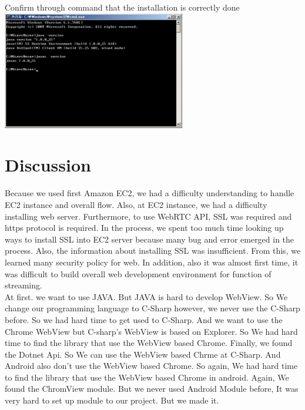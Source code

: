 \documentclass[12pt]{article}
\begin{document}
\begin{center}
Confirm through command that the installation is correctly done\\ [1\baselineskip]
\includegraphics[width=80mm,scale=1.3]{jdk8}
\end{center}

\newpage

\section{Discussion}
Because we used first Amazon EC2, we had a difficulty understanding to handle EC2 instance and overall flow. Also, at EC2 instance, we had a difficulty installing web server. Furthermore, to use WebRTC API, SSL was required and https protocol is required. In the process, we spent too much time looking up ways to install SSL into EC2 server because many bug and error emerged in the process. Also, the information about installing SSL was insufficient. From this, we learned many security policy for web. In addition, also it was almost first time, it was difficult to build overall web development environment for function of streaming.\\

At first. we want to use JAVA. But JAVA is hard to develop WebView. So We change our programming language to C-Sharp however, we never use the C-Sharp before. So we had hard time to get used to C-Sharp. And we want to use the Chrome WebView but C-sharp’s WebView is based on Explorer. So We had hard time to find the library that use the WebView based Chrome. Finally, we found the Dotnet Api. So We can use the WebView based Chrme at C-Sharp. And Android also don’t use the WebView based Chrome. So again, We had hard time to find the library that use the WebView based Chrome in android. Again, We found the ChromView module. But we never used Android Module before, It was very hard to set up module to our project. But we made it. \\
\end{document}
